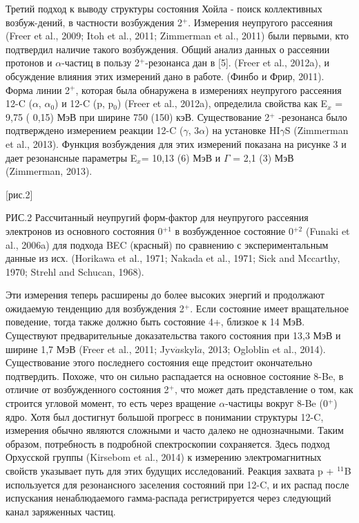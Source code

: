 \documentclass[fontsize=14pt]{scrarticle}
\begin{document}
Третий подход к выводу структуры состояния Хойла - поиск коллективных возбуж-дений, в частности возбуждения 2$^{+}$. Измерения неупругого рассеяния (Freer et al., 2009; Itoh et al., 2011; Zimmerman et al., 2011) были первыми, кто подтвердил наличие такого возбуждения. Общий анализ данных о рассеянии протонов и $\alpha$-частиц в пользу 2$^{+}$-резонанса дан в [5]. (Freer et al., 2012a), и обсуждение влияния этих измерений дано в работе. (Финбо и Фрир, 2011). Форма линии 2$^{+}$, которая была обнаружена в измерениях неупругого рассеяния 12-C ($\alpha$, $\alpha_{0}$) и 12-C (p, p$_{0}$) (Freer et al., 2012a), определила свойства как E$_{x}$ = 9,75 ( 0,15) МэВ при ширине 750 (150) кэВ. Существование 2$^{+}$ -резонанса было подтверждено измерением реакции 12-C ($\gamma$, 3$\alpha$) на установке HI$\gamma$S (Zimmerman et al., 2013). Функция возбуждения для этих измерений показана на рисунке 3 и дает резонансные параметры E$_{x}$= 10,13 (6) МэВ и $\Gamma$ = 2,1 (3) МэВ (Zimmerman, 2013).

[рис.2]

РИС.2  Рассчитанный неупругий форм-фактор для неупругого рассеяния электронов из основного состояния 0$^{+1}$ в возбужденное состояние 0$^{+2}$ (Funaki et al., 2006a) для подхода BEC (красный) по сравнению с экспериментальным данные из исх. (Horikawa et al., 1971; Nakada et al., 1971; Sick and Mccarthy, 1970; Strehl and Schucan, 1968).

Эти измерения теперь расширены до более высоких энергий и продолжают ожидаемую тенденцию для возбуждения 2$^{+}$. Если состояние имеет вращательное поведение, тогда также должно быть состояние 4+, близкое к 14 МэВ. Существуют предварительные доказательства такого состояния при 13,3 МэВ и ширине 1,7 МэВ (Freer et al., 2011; Jyv$\ddot{a}$skyl$\ddot{a}$, 2013; Ogloblin et al., 2014). Существование этого последнего состояния еще предстоит окончательно подтвердить. Похоже, что он сильно распадается на основное состояние 8-Be, в отличие от возбужденного состояния 2$^{+}$, что может дать представление о том, как строится угловой момент, то есть через вращение $\alpha$-частицы вокруг 8-Be (0$^{+}$) ядро. Хотя был достигнут большой прогресс в понимании структуры 12-C, измерения обычно являются сложными и часто далеко не однозначными. Таким образом, потребность в подробной спектроскопии сохраняется. Здесь подход Орхусской группы (Kirsebom et al., 2014) к измерению электромагнитных свойств указывает путь для этих будущих исследований. Реакция захвата p + $^{11}$B используется для резонансного заселения состояний при 12-C, и их распад после испускания ненаблюдаемого гамма-распада регистрируется через следующий канал заряженных частиц.
\end{document}
